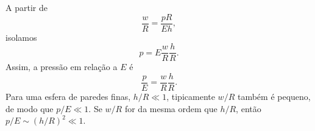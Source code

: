 A partir de
\[
\frac{w}{R}=\frac{pR}{Eh},
\]
isolamos
\[
p=E\frac{w}{R}\frac{h}{R}.
\]
Assim, a pressão em relação a $E$ é
\[
\frac{p}{E}=\frac{w}{R}\frac{h}{R}.
\]
Para uma esfera de paredes finas, $h/R\ll1$, tipicamente $w/R$ também é pequeno, de modo que $p/E\ll1$. Se $w/R$ for da mesma ordem que $h/R$, então $p/E\sim(h/R)^{2}\ll1$.